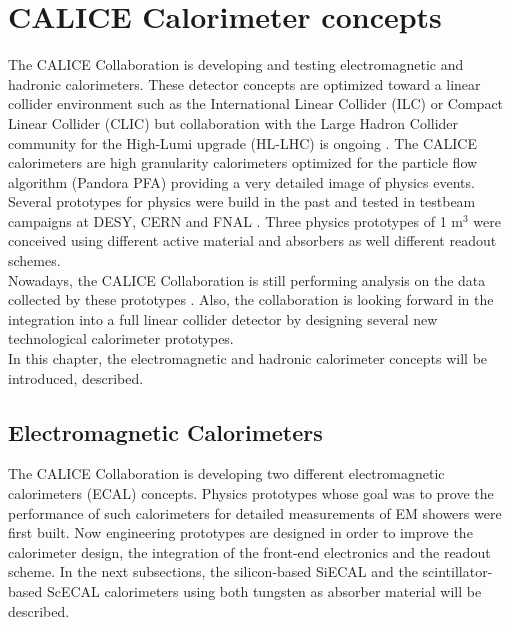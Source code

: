 \chapter{CALICE Calorimeter concepts}

The CALICE Collaboration is developing and testing electromagnetic and hadronic calorimeters. These detector concepts are optimized toward a linear collider environment such as the International Linear Collider (ILC) \cite{Behnke:2013lya} or Compact Linear Collider (CLIC) \cite{2012arXiv1202.5940L} but collaboration with the Large Hadron Collider community for the High-Lumi upgrade (HL-LHC) is ongoing \cite{1748-0221-12-01-C01042}. The CALICE calorimeters are high granularity calorimeters optimized for the particle flow algorithm (Pandora PFA) providing a very detailed image of physics events.\\
Several prototypes for physics were build in the past and tested in testbeam campaigns at DESY, CERN and FNAL \cite{1748-0221-3-08-P08001, 1748-0221-5-05-P05004, 1707.07126v2, 1748-0221-10-10-P10039, 1748-0221-3-05-P05001}. Three physics prototypes of 1 m$^3$ were conceived using different active material and absorbers as well different readout schemes.\\
Nowadays, the CALICE Collaboration is still performing analysis on the data collected by these prototypes \cite{OskarCAN, YasmineCAN}. Also, the collaboration is looking forward in the integration into a full linear collider detector by designing several new technological calorimeter prototypes.\\
In this chapter, the electromagnetic and hadronic calorimeter concepts will be introduced, described.

\section{Electromagnetic Calorimeters}

The CALICE Collaboration is developing two different electromagnetic calorimeters (ECAL) concepts. Physics prototypes whose goal was to prove the performance of such calorimeters for detailed measurements of EM showers were first built. Now engineering prototypes are designed in order to improve the calorimeter design, the integration of the front-end electronics and the readout scheme. In the next subsections, the silicon-based SiECAL and the scintillator-based ScECAL calorimeters using both tungsten as absorber material will be described.

